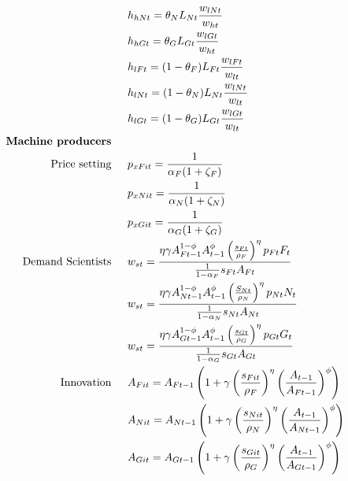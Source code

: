 \begin{align}
& h_{hNt}= \theta_{N}L_{Nt}\frac{w_{lNt}}{w_{ht}}\nonumber\\
& h_{hGt}= \theta_{G}L_{Gt}\frac{w_{lGt}}{w_{ht}}\nonumber\\
& h_{lFt}= (1-\theta_{F})L_{Ft}\frac{w_{lFt}}{w_{lt}}\nonumber\\%
& h_{lNt}= (1-\theta_{N}) L_{Nt}\frac{w_{lNt}}{w_{lt}}\nonumber\\
& h_{lGt}= (1-\theta_{G}) L_{Gt}\frac{w_{lGt}}{w_{lt}}\nonumber\\
%
\text{\textbf{Machine producers}}\ \hspace{4mm}\nonumber\\
\text{Price setting}\ \hspace{4mm}&p_{xFit}=\frac{1}{\alpha_F(1+\zeta_F)}\nonumber\\
&p_{xNit}=\frac{1}{\alpha_N(1+\zeta_N)}\nonumber\\
&p_{xGit}=\frac{1}{\alpha_G(1+\zeta_G)}
\nonumber\\ 
\text{Demand Scientists}\ \hspace{4mm}&
w_{st}=\frac{\eta \gamma A_{Ft-1}^{1-\phi}A_{t-1}^{\phi}\left(\frac{s_{Ft}}{\rho_F}\right)^{\eta}p_{Ft}F_t}{\frac{1}{1-\alpha_F}s_{Ft}A_{Ft}}\nonumber\\
&
w_{st}=\frac{\eta \gamma  A_{Nt-1}^{1-\phi}A_{t-1}^{\phi}\left(\frac{S_{Nt}}{\rho_N}\right)^{\eta}p_{Nt}N_t}{\frac{1}{1-\alpha_N}s_{Nt}A_{Nt}}\nonumber\\
&
w_{st}=\frac{\eta \gamma  A_{Gt-1}^{1-\phi}A_{t-1}^{\phi}\left(\frac{s_{Gt}}{\rho_G}\right)^{\eta}p_{Gt}G_t}{\frac{1}{1-\alpha_G}s_{Gt}A_{Gt}}\nonumber\\
\text{Innovation}\ \hspace{4mm}&
A_{Fit}=A_{Ft-1}\left(1+\gamma\left(\frac{s_{Fit}}{\rho_F}\right)^{\eta}\left(\frac{A_{t-1}}{A_{Ft-1}}\right)^{\phi}\right)\nonumber \\
&
A_{Nit}=A_{Nt-1}\left(1+\gamma\left(\frac{s_{Nit}}{\rho_N}\right)^{\eta}\left(\frac{A_{t-1}}{A_{Nt-1}}\right)^{\phi}\right)\nonumber \\
&
A_{Git}=A_{Gt-1}\left(1+\gamma\left(\frac{s_{Git}}{\rho_G}\right)^{\eta}\left(\frac{A_{t-1}}{A_{Gt-1}}\right)^{\phi}\right)\nonumber \\

\end{align}
